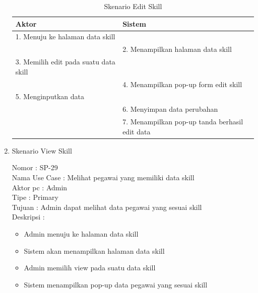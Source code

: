 \begin{enumerate}
\begin{itemize}
\end{itemize}

\begin{table}
	\caption{Skenario Edit Skill}
	\centering
	\begin{tabular}{ | l | p{66mm} |}
		\hline 
		\textbf{Aktor} & \textbf{Sistem} \\
		\hline
		
		1.	Menuju ke halaman data skill &  \\
		
		\hline
		
		&  2.	Menampilkan halaman data skill \\
		
		\hline
		
		3. Memilih edit pada suatu data skill & \\
		
		\hline
		
		& 4.	Menampilkan pop-up form edit skill \\
		
		\hline
		
		5.	Menginputkan data  & \\
		\hline
		
		& 6.	Menyimpan data perubahan \\
		\hline
		
		& 7.	Menampilkan pop-up tanda berhasil edit data \\
		\hline
		
	\end{tabular}
\end{table}

\item Skenario View Skill

Nomor \kern 3.6pc : SP-29 \\
Nama Use Case : Melihat pegawai yang memiliki data skill \\
Aktor  pc : Admin \\
Tipe \kern 4.6pc : Primary \\
Tujuan \kern 3.6pc : Admin dapat melihat data pegawai yang sesuai skill \\
Deskripsi \kern 2.5pc : 
\\
\begin{itemize}
	\item Admin menuju ke halaman data skill
	\item Sistem akan menampilkan halaman data skill
	\item Admin memilih view pada suatu data skill
	\item Sistem menampilkan pop-up data pegawai yang sesuai skill
	

\end{itemize}
\end{enumerate}
